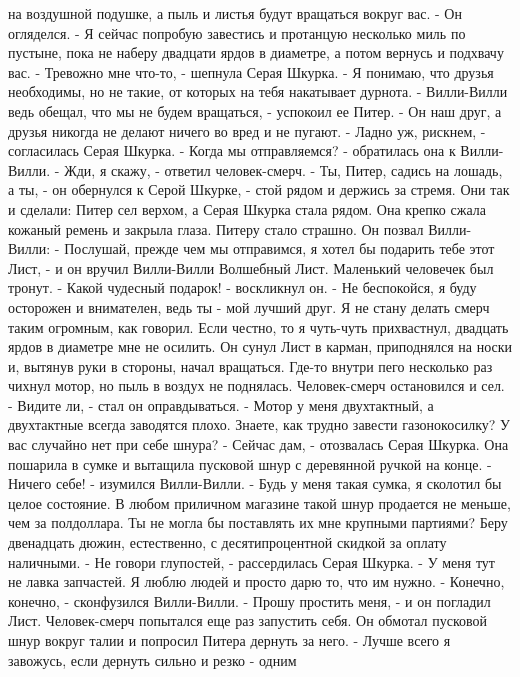 на воздушной подушке, а пыль и листья будут вращаться вокруг вас. - Он 
огляделся. - Я сейчас попробую завестись и протанцую несколько миль по 
пустыне, пока не наберу двадцати ярдов в диаметре, а потом вернусь и 
подхвачу вас.
    - Тревожно мне что-то, - шепнула Серая Шкурка. - Я понимаю, что 
друзья необходимы, но не такие, от которых на тебя накатывает дурнота.
    - Вилли-Вилли ведь обещал, что мы не будем вращаться, - успокоил 
ее Питер. - Он наш друг, а друзья никогда не делают ничего во вред и 
не пугают.
    - Ладно уж, рискнем, - согласилась Серая Шкурка. - Когда мы 
отправляемся? - обратилась она к Вилли-Вилли.
    - Жди, я скажу, - ответил человек-смерч. - Ты, Питер, садись на 
лошадь, а ты, - он обернулся к Серой Шкурке, - стой рядом и держись за 
стремя.
    Они так и сделали: Питер сел верхом, а Серая Шкурка стала рядом. 
Она крепко сжала кожаный ремень и закрыла глаза.
    Питеру стало страшно. Он позвал Вилли-Вилли:
    - Послушай, прежде чем мы отправимся, я хотел бы подарить тебе 
этот Лист, - и он вручил Вилли-Вилли Волшебный Лист.
    Маленький человечек был тронут.
    - Какой чудесный подарок! - воскликнул он. - Не беспокойся, я буду 
осторожен и внимателен, ведь ты - мой лучший друг. Я не стану делать 
смерч таким огромным, как говорил. Если честно, то я чуть-чуть 
прихвастнул, двадцать ярдов в диаметре мне не осилить.
    Он сунул Лист в карман, приподнялся на носки и, вытянув руки в 
стороны, начал вращаться. Где-то внутри пего несколько раз чихнул 
мотор, но пыль в воздух не поднялась. Человек-смерч остановился и сел.
    - Видите ли, - стал он оправдываться. - Мотор у меня двухтактный, 
а двухтактные всегда заводятся плохо. Знаете, как трудно завести 
газонокосилку? У вас случайно нет при себе шнура?
    - Сейчас дам, - отозвалась Серая Шкурка. Она пошарила в сумке и 
вытащила пусковой шнур с деревянной ручкой на конце.
    - Ничего себе! - изумился Вилли-Вилли. - Будь у меня такая сумка, 
я сколотил бы целое состояние. В любом приличном магазине такой шнур 
продается не меньше, чем за полдоллара. Ты не могла бы поставлять их 
мне крупными партиями? Беру двенадцать дюжин, естественно, с 
десятипроцентной скидкой за оплату наличными.
    - Не говори глупостей, - рассердилась Серая Шкурка. - У меня тут 
не лавка запчастей. Я люблю людей и просто дарю то, что им нужно.
    - Конечно, конечно, - сконфузился Вилли-Вилли. - Прошу простить 
меня, - и он погладил Лист.
    Человек-смерч попытался еще раз запустить себя. Он обмотал 
пусковой шнур вокруг талии и попросил Питера дернуть за него.
    - Лучше всего я завожусь, если дернуть сильно и резко - одним 
